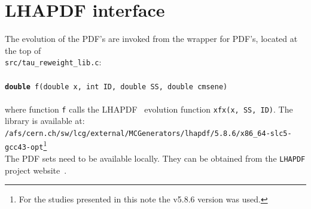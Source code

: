 \documentclass[12pt]{article}
\begin{document}


\section{LHAPDF interface}


The evolution of the PDF's are invoked from the wrapper for PDF's, located at the top of \\
{\tt src/tau\_reweight\_lib.c}: \\
\\
{\tt {\bf double} f(double x, int ID, double SS, double cmsene) } \\
\\
where function {\tt f} calls the LHAPDF~\cite{LHAPDF-website} evolution function {\tt xfx(x, SS, ID)}.
The library is available at:\\
 {\tt /afs/cern.ch/sw/lcg/external/MCGenerators/lhapdf/5.8.6/x86\_64-slc5-gcc43-opt}\footnote{For the studies 
presented in this note the v5.8.6 version was used.} \\
The PDF sets need to be available locally. They can be obtained from the {\tt LHAPDF} project website~\cite{LHAPDF-pdfsets}.
\end{document}
